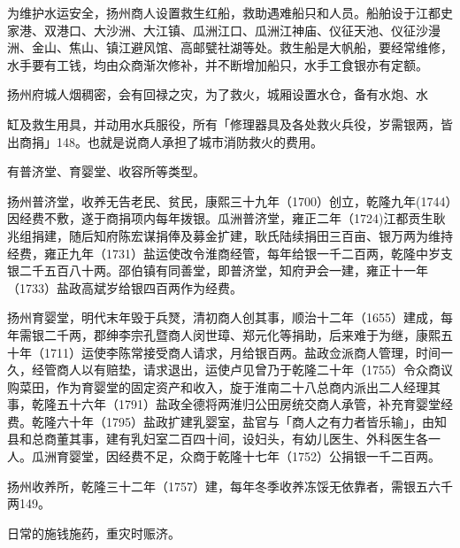 为维护水运安全，扬州商人设置救生红船，救助遇难船只和人员。船舶设于江都史家港、双港口、大沙洲、大江镇、瓜洲江口、瓜洲江神庙、仪征天池、仪征沙漫洲、金山、焦山、镇江避风馆、高邮甓社湖等处。救生船是大帆船，要经常维修，水手要有工钱，均由众商渐次修补，并不断增加船只，水手工食银亦有定额。


扬州府城人烟稠密，会有回禄之灾，为了救火，城厢设置水仓，备有水炮、水

\vfill
\begin{BookNotes}
\end{BookNotes}

\noindent 缸及救生用具，并动用水兵服役，所有「修理器具及各处救火兵役，岁需银两，皆出商捐」148。也就是说商人承担了城市消防救火的费用。


有普济堂、育婴堂、收容所等类型。

扬州普济堂，收养无告老民、贫民，康熙三十九年（1700）创立，乾隆九年(1744）因经费不敷，遂于商捐项内每年拨银。瓜洲普济堂，雍正二年（1724)江都贡生耿兆组捐建，随后知府陈宏谋捐俸及募金扩建，耿氏陆续捐田三百亩、银万两为维持经费，雍正九年（1731）盐运使改令淮商经管，每年给银一千二百两，乾隆中岁支银二千五百八十两。邵伯镇有同善堂，即普济堂，知府尹会一建，雍正十一年（1733）盐政高斌岁给银四百两作为经费。

扬州育婴堂，明代末年毁于兵燹，清初商人创其事，顺治十二年（1655）建成，每年需银二千两，郡绅李宗孔暨商人闵世璋、郑元化等捐助，后来难于为继，康熙五十年（1711）运使李陈常接受商人请求，月给银百两。盐政佥派商人管理，时间一久，经管商人以有赔垫，请求退出，运使卢见曾乃于乾隆二十年（1755）令众商议购菜田，作为育婴堂的固定资产和收入，旋于淮南二十八总商内派出二人经理其事，乾隆五十六年（1791）盐政全德将两淮归公田房统交商人承管，补充育婴堂经费。乾隆六十年（1795）盐政扩建乳婴室，盐官与「商人之有力者皆乐输」，由知县和总商董其事，建有乳妇室二百四十间，设妇头，有幼儿医生、外科医生各一人。瓜洲育婴堂，因经费不足，众商于乾隆十七年（1752）公捐银一千二百两。

扬州收养所，乾隆三十二年（1757）建，每年冬季收养冻馁无依靠者，需银五六千两149。


日常的施钱施药，重灾时赈济。

\vfill
\begin{BookNotes}
\end{BookNotes}

